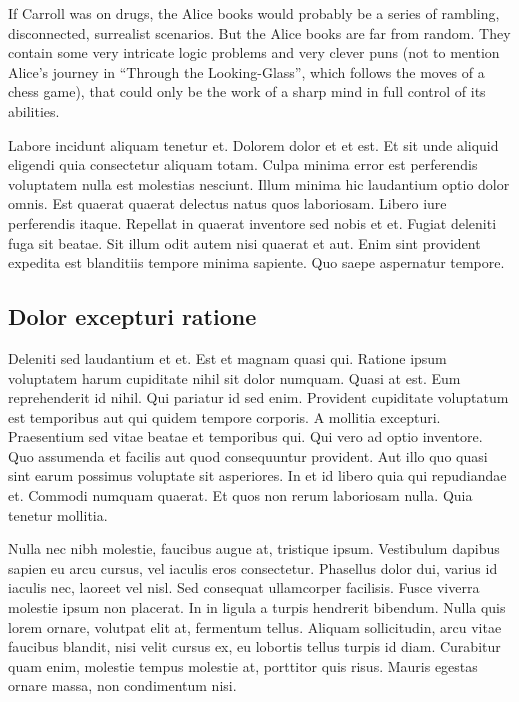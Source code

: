 \documentclass[12pt, a4paper]{article}
\begin{document}
\begin{displayquote}
    If Carroll was on drugs, the Alice books would probably be a series of rambling, disconnected, surrealist scenarios. But the Alice books are far from random. They contain some very intricate logic problems and very clever puns (not to mention Alice’s journey in “Through the Looking-Glass”, which follows the moves of a chess game), that could only be the work of a sharp mind in full control of its abilities. \autocite{rooy_faq}
\end{displayquote}

Labore incidunt aliquam tenetur et. Dolorem dolor et et est. Et sit unde aliquid eligendi quia consectetur aliquam totam. Culpa minima error est perferendis voluptatem nulla est molestias nesciunt. Illum minima hic laudantium optio dolor omnis. Est quaerat quaerat delectus natus quos laboriosam. Libero iure perferendis itaque. Repellat in quaerat inventore sed nobis et et. Fugiat deleniti fuga sit beatae. Sit illum odit autem nisi quaerat et aut. Enim sint provident expedita est blanditiis tempore minima sapiente. Quo saepe aspernatur tempore.

\subsection{Dolor excepturi ratione}

Deleniti sed laudantium et et. Est et magnam quasi qui. Ratione ipsum voluptatem harum cupiditate nihil sit dolor numquam. Quasi at est. Eum reprehenderit id nihil. Qui pariatur id sed enim. Provident cupiditate voluptatum est temporibus aut qui quidem tempore corporis. A mollitia excepturi. Praesentium sed vitae beatae et temporibus qui. Qui vero ad optio inventore. Quo assumenda et facilis aut quod consequuntur provident. Aut illo quo quasi sint earum possimus voluptate sit asperiores. In et id libero quia qui repudiandae et. Commodi numquam quaerat. Et quos non rerum laboriosam nulla. Quia tenetur mollitia.

Nulla nec nibh molestie, faucibus augue at, tristique ipsum. Vestibulum dapibus sapien eu arcu cursus, vel iaculis eros consectetur. Phasellus dolor dui, varius id iaculis nec, laoreet vel nisl. Sed consequat ullamcorper facilisis. Fusce viverra molestie ipsum non placerat. In in ligula a turpis hendrerit bibendum. Nulla quis lorem ornare, volutpat elit at, fermentum tellus. Aliquam sollicitudin, arcu vitae faucibus blandit, nisi velit cursus ex, eu lobortis tellus turpis id diam. Curabitur quam enim, molestie tempus molestie at, porttitor quis risus. Mauris egestas ornare massa, non condimentum nisi.
\end{document}
